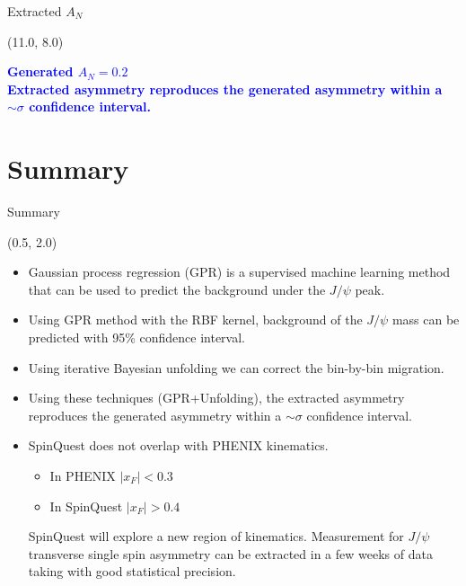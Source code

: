\documentclass[10pt, xcolor={dvipsnames}, aspectratio = 169]{beamer}
\newcommand{\jpsi}{$J/\psi$ }
\begin{document}
\begin{frame}{Extracted $A_{N}$}
\begin{textblock}{5.0}(11.0, 8.0)
\begin{small}
\textcolor{blue}{\textbf{Generated $A_{N} = \text{0.2}$ \\
Extracted asymmetry reproduces the generated asymmetry within a $\sim \sigma$ confidence interval.}}
\end{small}
\end{textblock}

\end{frame}

%
%
\section{Summary}

\begin{frame}{Summary}

\begin{textblock}{15.0}(0.5, 2.0)

\begin{itemize}

\item Gaussian process regression (GPR) is a supervised machine learning method that can be used to predict the background under the \jpsi peak.

\item Using GPR method with the RBF kernel, background of the \jpsi mass can be predicted with 95\% confidence interval.

\item Using iterative Bayesian unfolding we can correct the bin-by-bin migration.

\item Using these techniques (GPR+Unfolding), the extracted asymmetry reproduces the generated asymmetry within a $\sim \sigma$
confidence interval.

\item  SpinQuest does not overlap with PHENIX kinematics.

\begin{itemize}

    \item In PHENIX $|x_{F}| < 0.3$

    \item In SpinQuest $|x_{F}| > 0.4$

\end{itemize}

SpinQuest  will explore a new region of kinematics. Measurement for \jpsi transverse single spin asymmetry can be extracted in a few weeks of data taking with good statistical precision.


\end{itemize}
\end{textblock}
\end{frame}
\end{document}
